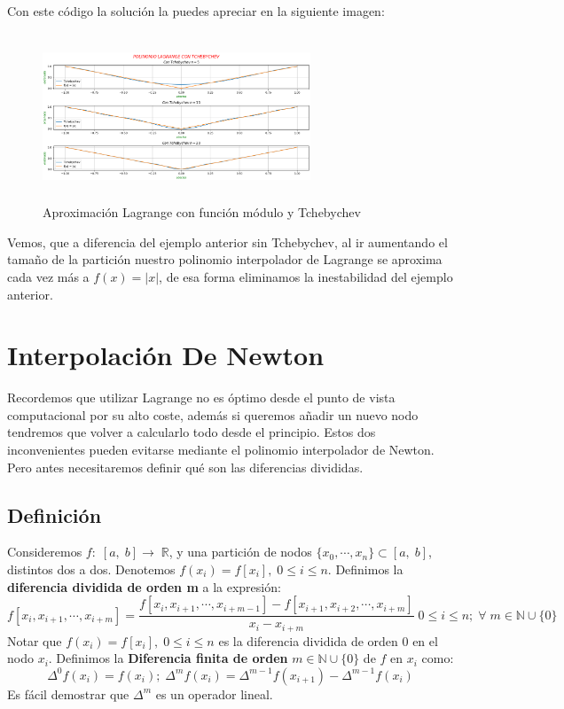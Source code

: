 \documentclass[12pt,a4paper,oneside]{scrbook}
\newcounter{ns}
\begin{document}
Con este código la solución la puedes apreciar en la siguiente imagen:
\begin{figure}[h!]
    \centering
    \includegraphics[width=8cm,height=5cm]{Lagrange_con_Tchebychev.png}
    \caption{Aproximación Lagrange con función módulo y Tchebychev}
    \label{fig:tchebychev}
\end{figure}
Vemos, que a diferencia del ejemplo anterior sin Tchebychev, al ir aumentando el tamaño de la partición nuestro polinomio interpolador de Lagrange se aproxima cada vez más a $f(x)=|x|$, de esa forma eliminamos la inestabilidad del ejemplo anterior.
\section{Interpolación De Newton}
Recordemos que utilizar Lagrange no es óptimo desde el punto de vista computacional por su alto coste, además si queremos añadir un nuevo nodo tendremos que volver a calcularlo todo desde el principio.
Estos dos inconvenientes pueden evitarse mediante el polinomio interpolador de Newton. Pero antes necesitaremos definir qué son las diferencias divididas.
\subsection*{Definición}
Consideremos $f:\;[a,\;b]\longrightarrow\;\mathbb{R}$, y una partición de nodos $\{ x_0,\cdots ,x_n \}\subset [a,\;b]$, distintos dos a dos. Denotemos $f(x_i)=f[x_i],\;0\leq i\leq n$. Definimos la \textbf{diferencia dividida de orden m} a la expresión:
$$
f[x_i,x_{i+1},\cdots ,x_{i+m}]=\dfrac{f[x_i,x_{i+1},\cdots ,x_{i+m-1}]-f[x_{i+1},x_{i+2},\cdots ,x_{i+m}]}{x_i-x_{i+m}}\;0\leq i\leq n;\;\forall\; m\in \mathbb{N}\cup\{0\}
$$
Notar que $f(x_i)=f[x_i],\;0\leq i\leq n$ es la diferencia dividida de orden 0 en el nodo $x_i$.
Definimos la \textbf{Diferencia finita de orden} $m\in \mathbb{N}\cup\{0\}$ de $f$ en $x_i$ como:
$$
\Delta^0f(x_i)=f(x_i);\;\Delta^mf(x_i)=\Delta^{m-1}f(x_{i+1})-\Delta^{m-1}f(x_i)
$$
Es fácil demostrar que $\Delta^m$ es un operador lineal.
\end{document}
